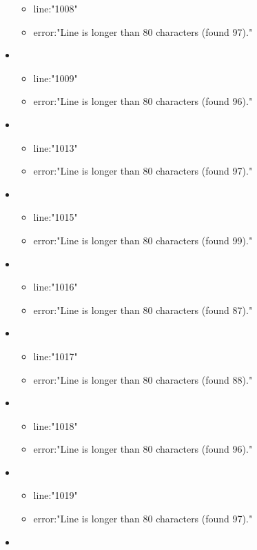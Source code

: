 \begin{itemize}
\begin{itemize}
		\item line:"1008" 
		\item error:"Line is longer than 80 characters (found 97)." 
	\end{itemize}
	\item 
	\begin{itemize} 
		\item line:"1009" 
		\item error:"Line is longer than 80 characters (found 96)." 
	\end{itemize}
	\item 
	\begin{itemize} 
		\item line:"1013" 
		\item error:"Line is longer than 80 characters (found 97)." 
	\end{itemize}
	\item 
	\begin{itemize} 
		\item line:"1015" 
		\item error:"Line is longer than 80 characters (found 99)." 
	\end{itemize}
	\item 
	\begin{itemize} 
		\item line:"1016" 
		\item error:"Line is longer than 80 characters (found 87)." 
	\end{itemize}
	\item 
	\begin{itemize} 
		\item line:"1017" 
		\item error:"Line is longer than 80 characters (found 88)." 
	\end{itemize}
	\item 
	\begin{itemize} 
		\item line:"1018" 
		\item error:"Line is longer than 80 characters (found 96)." 
	\end{itemize}
	\item 
	\begin{itemize} 
		\item line:"1019" 
		\item error:"Line is longer than 80 characters (found 97)." 
	\end{itemize}
	\item 
	\begin{itemize} 

\end{itemize}
\end{itemize}
